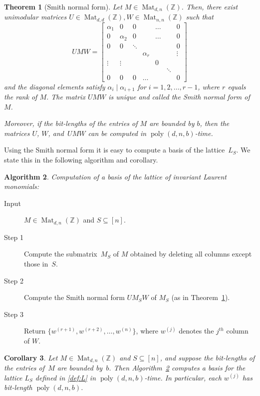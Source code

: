 \documentclass[10pt,a4paper]{article}
\DeclareMathOperator{\poly}{poly}
\DeclareMathOperator{\Mat}{Mat}
\newtheorem{theorem}{Theorem}[section]
\newtheorem{corollary}[theorem]{Corollary}
\theoremstyle{definition}
\newtheorem{algorithm}[theorem]{Algorithm}
\numberwithin{equation}{section}
\newcommand{\ZZ}{\mathbb{Z}}
\begin{document}
\begin{theorem}[Smith normal form]\label{thm:smith}
Let $M\in\Mat_{d,n}(\ZZ)$. Then, there exist unimodular matrices $U\in\Mat_{d,d}(\ZZ), W\in\Mat_{n,n}(\ZZ)$ such that
\[
  UMW=\begin{bmatrix}
\alpha_1 & 0 & 0 & & \dots & & 0\\
0 & \alpha_2 & 0 & & \dots & & 0\\
0 & 0 & \ddots & & & & 0\\
 & & & \alpha_r & & & \vdots\\
\vdots &\vdots & & & 0 & & \\
 & & & &  &\ddots & \\
0 & 0 & 0 & \dots & & & 0
\end{bmatrix}
\]
and the diagonal elements satisfy $\alpha_i\mid \alpha_{i+1}$ for $i=1,2,\dots,r-1$, where $r$ equals the rank of $M$.
The matrix $UMW$ is unique and called the Smith normal form of $M$.

Moreover, if the bit-lengths of the entries of $M$ are bounded by $b$, then the matrices $U$, $W$, and~$UMW$ can be computed in $\poly(d,n,b)$-time.
\end{theorem}

Using the Smith normal form it is easy to compute a basis of the lattice~$L_S$.
We state this in the following algorithm and corollary.

\begin{algorithm}\label{algo-lattice} \emph{Computation of a basis of the lattice of invariant Laurent monomials:}
\begin{description}
\item [Input]  $M \in \Mat_{d,n}(\ZZ)$ and $S\subseteq[n]$.
\item [Step 1] Compute the submatrix~$M_S$ of $M$ obtained by deleting all columns except those in~$S$.
\item [Step 2] Compute the Smith normal form $UM_SW$ of $M_S$ (as in Theorem~\ref{thm:smith}).
\item [Step 3] Return $\{w^{(r+1)}, w^{(r+2)}, \dots, w^{(n)}\}$, where $w^{(j)}$ denotes the $j^{th}$ column of $W$.
\end{description}
\end{algorithm}


\begin{corollary}\label{cor:smith}
Let $M\in\Mat_{d, n}(\ZZ)$ and $S \subseteq [n]$, and suppose the bit-lengths of the entries of~$M$ are bounded by~$b$.
Then Algorithm~\ref{algo-lattice} computes a basis for the lattice $L_S$ defined in \eqref{def:L} in $\poly(d,n,b)$-time.
In particular, each $w^{(j)}$ has bit-length $\poly(d,n,b)$.
\end{corollary}
\end{document}
